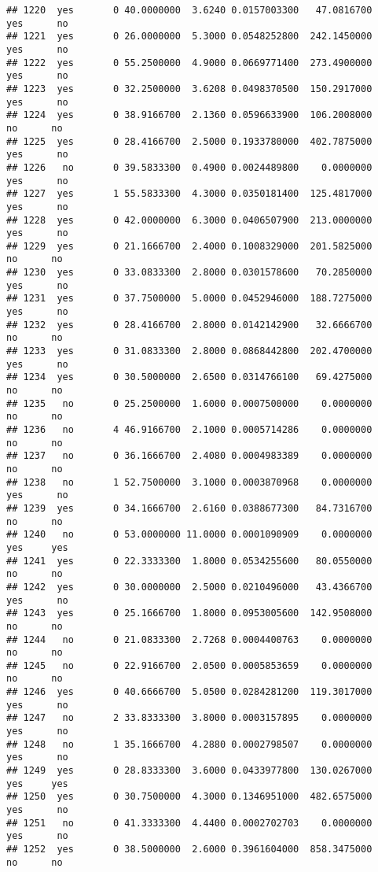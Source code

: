 \documentclass[]{article}
\begin{document}
\begin{verbatim}
## 1220  yes       0 40.0000000  3.6240 0.0157003300   47.0816700   yes      no
## 1221  yes       0 26.0000000  5.3000 0.0548252800  242.1450000   yes      no
## 1222  yes       0 55.2500000  4.9000 0.0669771400  273.4900000   yes      no
## 1223  yes       0 32.2500000  3.6208 0.0498370500  150.2917000   yes      no
## 1224  yes       0 38.9166700  2.1360 0.0596633900  106.2008000    no      no
## 1225  yes       0 28.4166700  2.5000 0.1933780000  402.7875000   yes      no
## 1226   no       0 39.5833300  0.4900 0.0024489800    0.0000000   yes      no
## 1227  yes       1 55.5833300  4.3000 0.0350181400  125.4817000   yes      no
## 1228  yes       0 42.0000000  6.3000 0.0406507900  213.0000000   yes      no
## 1229  yes       0 21.1666700  2.4000 0.1008329000  201.5825000    no      no
## 1230  yes       0 33.0833300  2.8000 0.0301578600   70.2850000   yes      no
## 1231  yes       0 37.7500000  5.0000 0.0452946000  188.7275000   yes      no
## 1232  yes       0 28.4166700  2.8000 0.0142142900   32.6666700    no      no
## 1233  yes       0 31.0833300  2.8000 0.0868442800  202.4700000   yes      no
## 1234  yes       0 30.5000000  2.6500 0.0314766100   69.4275000    no      no
## 1235   no       0 25.2500000  1.6000 0.0007500000    0.0000000    no      no
## 1236   no       4 46.9166700  2.1000 0.0005714286    0.0000000    no      no
## 1237   no       0 36.1666700  2.4080 0.0004983389    0.0000000    no      no
## 1238   no       1 52.7500000  3.1000 0.0003870968    0.0000000   yes      no
## 1239  yes       0 34.1666700  2.6160 0.0388677300   84.7316700    no      no
## 1240   no       0 53.0000000 11.0000 0.0001090909    0.0000000   yes     yes
## 1241  yes       0 22.3333300  1.8000 0.0534255600   80.0550000    no      no
## 1242  yes       0 30.0000000  2.5000 0.0210496000   43.4366700   yes      no
## 1243  yes       0 25.1666700  1.8000 0.0953005600  142.9508000    no      no
## 1244   no       0 21.0833300  2.7268 0.0004400763    0.0000000    no      no
## 1245   no       0 22.9166700  2.0500 0.0005853659    0.0000000    no      no
## 1246  yes       0 40.6666700  5.0500 0.0284281200  119.3017000   yes      no
## 1247   no       2 33.8333300  3.8000 0.0003157895    0.0000000   yes      no
## 1248   no       1 35.1666700  4.2880 0.0002798507    0.0000000   yes      no
## 1249  yes       0 28.8333300  3.6000 0.0433977800  130.0267000   yes     yes
## 1250  yes       0 30.7500000  4.3000 0.1346951000  482.6575000   yes      no
## 1251   no       0 41.3333300  4.4400 0.0002702703    0.0000000   yes      no
## 1252  yes       0 38.5000000  2.6000 0.3961604000  858.3475000    no      no

\end{verbatim}
\end{document}
